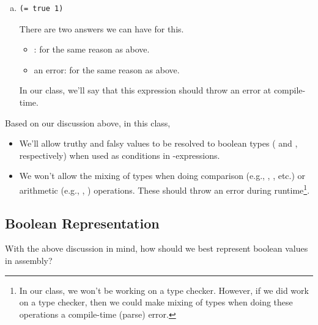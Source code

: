 \begin{mdframed}
\begin{enumerate}[a.]
        \item \begin{verbatim}
(= true 1)\end{verbatim}

        \begin{mdframed}
            There are two answers we can have for this. 
            \begin{itemize}
                \item {}: for the same reason as above.
                \item an error: for the same reason as above. 
            \end{itemize}
            In our class, we'll say that this expression should throw an error at compile-time.
        \end{mdframed}
    \end{enumerate}
\end{mdframed}
Based on our discussion above, in this class, 
\begin{itemize}
    \item We'll allow truthy and falsy values to be resolved to boolean types ( and , respectively) when used as conditions in -expressions.
    \item We won't allow the mixing of types when doing comparison (e.g., \code{=}, \code{<}, etc.) or arithmetic (e.g., \code{+}, \code{-}) operations. These should throw an error during runtime\footnote{In our class, we won't be working on a type checker. However, if we did work on a type checker, then we could make mixing of types when doing these operations a compile-time (parse) error.}.
\end{itemize}

\subsection{Boolean Representation}
With the above discussion in mind, how should we best represent boolean values in assembly?

